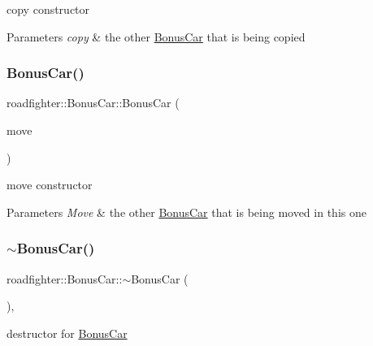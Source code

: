 copy constructor 
\begin{DoxyParams}{Parameters}
{\em copy} & the other \hyperlink{classroadfighter_1_1BonusCar}{Bonus\+Car} that is being copied \\
\hline
\end{DoxyParams}
\mbox{\label{classroadfighter_1_1BonusCar_a52b06b6ce44208f2df0e0679193008fa}} 
\subsubsection{\texorpdfstring{Bonus\+Car()}{BonusCar()}\hspace{0.1cm}{\footnotesize\ttfamily [3/3]}}
{\footnotesize\ttfamily roadfighter\+::\+Bonus\+Car\+::\+Bonus\+Car (\begin{DoxyParamCaption}\item[{\hyperlink{classroadfighter_1_1BonusCar}{Bonus\+Car} \&\&}]{move }\end{DoxyParamCaption})\hspace{0.3cm}{\ttfamily [default]}}

move constructor 
\begin{DoxyParams}{Parameters}
{\em Move} & the other \hyperlink{classroadfighter_1_1BonusCar}{Bonus\+Car} that is being moved in this one \\
\hline
\end{DoxyParams}
\mbox{\label{classroadfighter_1_1BonusCar_a055742bdc09217d56c34c7f582cf7670}} 
\subsubsection{\texorpdfstring{$\sim$\+Bonus\+Car()}{~BonusCar()}}
{\footnotesize\ttfamily roadfighter\+::\+Bonus\+Car\+::$\sim$\+Bonus\+Car (\begin{DoxyParamCaption}{ }\end{DoxyParamCaption})\hspace{0.3cm}{\ttfamily [override]}, {\ttfamily [default]}}

destructor for \hyperlink{classroadfighter_1_1BonusCar}{Bonus\+Car} 

